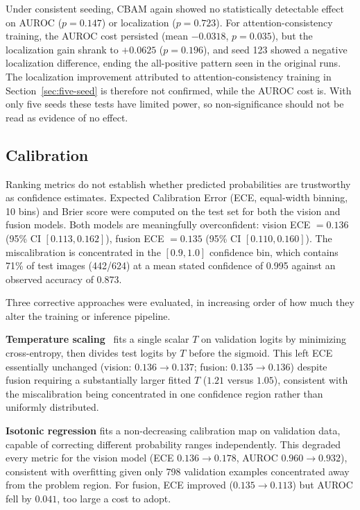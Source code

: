 Under consistent seeding, CBAM again showed no statistically detectable effect
on AUROC ($p=0.147$) or localization ($p=0.723$). For attention-consistency
training, the AUROC cost persisted (mean $-0.0318$, $p=0.035$), but the
localization gain shrank to $+0.0625$ ($p=0.196$), and seed 123 showed a
negative localization difference, ending the all-positive pattern seen in the
original runs. The localization improvement attributed to attention-consistency
training in Section~\ref{sec:five-seed} is therefore not confirmed, while the
AUROC cost is. With only five seeds these tests have limited power, so
non-significance should not be read as evidence of no effect.

\subsection{Calibration}
\label{sec:calibration}

Ranking metrics do not establish whether predicted probabilities are
trustworthy as confidence estimates. Expected Calibration Error (ECE,
equal-width binning, 10 bins) and Brier score were computed on the test
set for both the vision and fusion models. Both models are meaningfully
overconfident: vision ECE $=0.136$ (95\% CI $[0.113, 0.162]$), fusion ECE
$=0.135$ (95\% CI $[0.110, 0.160]$). The miscalibration is concentrated in
the $[0.9,1.0]$ confidence bin, which contains 71\% of test images (442/624)
at a mean stated confidence of 0.995 against an observed accuracy of 0.873.

Three corrective approaches were evaluated, in increasing order of how much
they alter the training or inference pipeline.

\textbf{Temperature scaling}~\cite{guo2017calibration} fits a single scalar
$T$ on validation logits by minimizing cross-entropy, then divides test
logits by $T$ before the sigmoid. This left ECE essentially unchanged
(vision: $0.136 \rightarrow 0.137$; fusion: $0.135 \rightarrow 0.136$) despite
fusion requiring a substantially larger fitted $T$ ($1.21$ versus $1.05$),
consistent with the miscalibration being concentrated in one confidence
region rather than uniformly distributed.

\textbf{Isotonic regression} fits a non-decreasing calibration map on
validation data, capable of correcting different probability ranges
independently. This degraded every metric for the vision model (ECE
$0.136 \rightarrow 0.178$, AUROC $0.960 \rightarrow 0.932$), consistent with
overfitting given only 798 validation examples concentrated away from the
problem region. For fusion, ECE improved ($0.135 \rightarrow 0.113$) but
AUROC fell by $0.041$, too large a cost to adopt.

